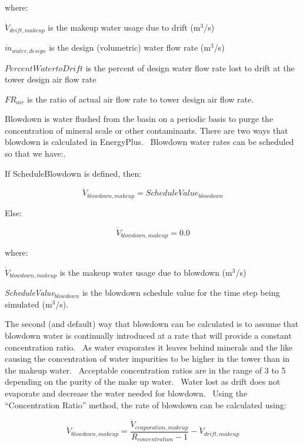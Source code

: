 where:

\({\dot V_{drift,makeup}}\) is the makeup water usage due to drift (m\(^{3}\)/s)

\({\dot m_{water,design}}\) is the design (volumetric) water flow rate (m\(^{3}\)/s)

\(PercentWatertoDrift\) is the percent of design water flow rate lost to drift at the tower design air flow rate

\(F{R_{air}}\) is the ratio of actual air flow rate to tower design air flow rate.

Blowdown is water flushed from the basin on a periodic basis to purge the concentration of mineral scale or other contaminants. There are two ways that blowdown is calculated in EnergyPlus.~ Blowdown water rates can be scheduled so that we have:.

If ScheduleBlowdown is defined, then:

\begin{equation}
  \dot{V}_{blowdown,makeup} = ScheduleValue_{blowdown}
\end{equation}

Else:

\begin{equation}
  \dot{V}_{blowdown,makeup} = 0.0
\end{equation}

where:

\({\dot V_{blowdown,makeup}}\) is the makeup water usage due to blowdown (m\(^{3}\)/s)

\emph{ScheduleValue\(_{blowdown}\)} is the blowdown schedule value for the time step being simulated (m\(^{3}\)/s).

The second (and default) way that blowdown can be calculated is to assume that blowdown water is continually introduced at a rate that will provide a constant concentration ratio.~ As water evaporates it leaves behind minerals and the like causing the concentration of water impurities to be higher in the tower than in the makeup water.~ Acceptable concentration ratios are in the range of 3 to 5 depending on the purity of the make up water.~ Water lost as drift does not evaporate and decrease the water needed for blowdown.~ Using the ``Concentration Ratio'' method, the rate of blowdown can be calculated using:

\begin{equation}
{\dot V_{blowdown,makeup}} = \frac{{{{\dot V}_{evaporation,makeup}}}}{{{R_{concentration}} - 1}} - {\dot V_{drift,makeup}}
\end{equation}

